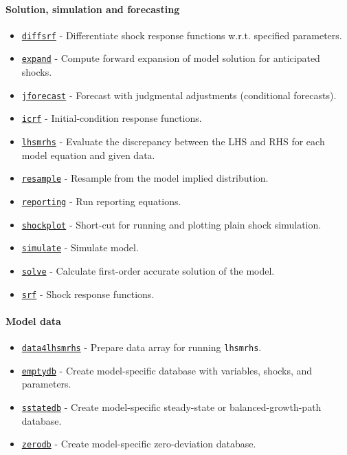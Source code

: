 \paragraph{Solution, simulation and forecasting}
 
 \begin{itemize}
 \item
   \href{model/diffsrf}{\texttt{diffsrf}} - Differentiate shock response
   functions w.r.t. specified parameters.
 \item
   \href{model/expand}{\texttt{expand}} - Compute forward expansion of
   model solution for anticipated shocks.
 \item
   \href{model/jforecast}{\texttt{jforecast}} - Forecast with judgmental
   adjustments (conditional forecasts).
 \item
   \href{model/icrf}{\texttt{icrf}} - Initial-condition response
   functions.
 \item
   \href{model/lhsmrhs}{\texttt{lhsmrhs}} - Evaluate the discrepancy
   between the LHS and RHS for each model equation and given data.
 \item
   \href{model/resample}{\texttt{resample}} - Resample from the model
   implied distribution.
 \item
   \href{model/reporting}{\texttt{reporting}} - Run reporting equations.
 \item
   \href{model/shockplot}{\texttt{shockplot}} - Short-cut for running and
   plotting plain shock simulation.
 \item
   \href{model/simulate}{\texttt{simulate}} - Simulate model.
 \item
   \href{model/solve}{\texttt{solve}} - Calculate first-order accurate
   solution of the model.
 \item
   \href{model/srf}{\texttt{srf}} - Shock response functions.
 \end{itemize}
 
 \paragraph{Model data}
 
 \begin{itemize}
 \item
   \href{model/data4lhsmrhs}{\texttt{data4lhsmrhs}} - Prepare data array
   for running \texttt{lhsmrhs}.
 \item
   \href{model/emptydb}{\texttt{emptydb}} - Create model-specific
   database with variables, shocks, and parameters.
 \item
   \href{model/sstatedb}{\texttt{sstatedb}} - Create model-specific
   steady-state or balanced-growth-path database.
 \item
   \href{model/zerodb}{\texttt{zerodb}} - Create model-specific
   zero-deviation database.
 \end{itemize}
 
